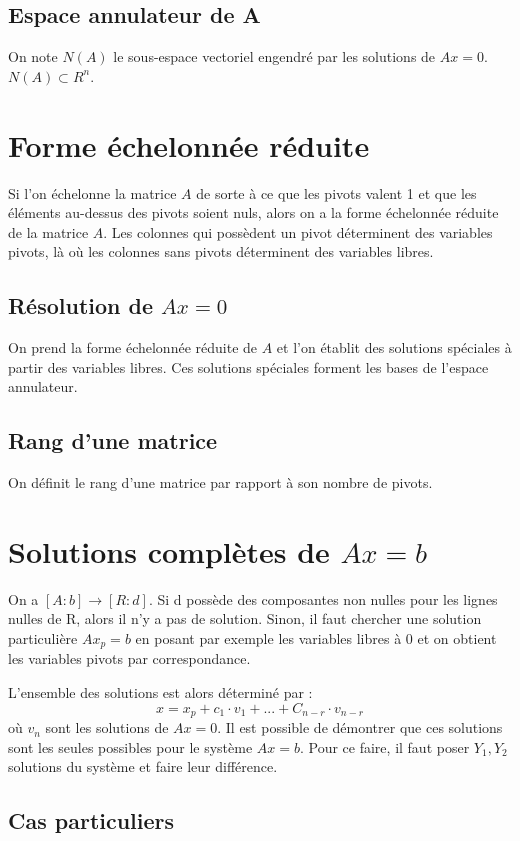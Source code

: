 \documentclass[a4paper]{book}
\begin{document}
\subsection{Espace annulateur de A}
On note $N(A)$ le sous-espace vectoriel engendré par les solutions de $Ax = 0$. $N(A) \subset R^n$.
\section{Forme échelonnée réduite}
Si l'on échelonne la matrice $A$ de sorte à ce que les pivots valent 1 et que les éléments au-dessus des pivots soient nuls, alors on a la forme échelonnée réduite de la matrice $A$. Les colonnes qui possèdent un pivot déterminent des variables pivots, là où les colonnes sans pivots déterminent des variables libres.
\subsection{Résolution de $Ax = 0$}
On prend la forme échelonnée réduite de $A$ et l'on établit des solutions spéciales à partir des variables libres. Ces solutions spéciales forment les bases de l'espace annulateur.
\subsection{Rang d'une matrice}
On définit le rang d'une matrice par rapport à son nombre de pivots.
\section{Solutions complètes de $Ax = b$}
On a $[A:b] \rightarrow [R:d]$. Si d possède des composantes non nulles pour les lignes nulles de R, alors il n'y a pas de solution.
\newline \indent Sinon, il faut chercher une solution particulière $Ax_p = b$ en posant par exemple les variables libres à 0 et on obtient les variables pivots par correspondance.
\begin{framed}
L'ensemble des solutions est alors déterminé par :
\begin{equation}
    x = x_p + c_1\cdot v_1 + ... +C_{n-r}\cdot v_{n-r}
\end{equation}
où $v_n$ sont les solutions de $Ax = 0$. Il est possible de démontrer que ces solutions sont les seules possibles pour le système $Ax = b$. Pour ce faire, il faut poser $Y_1, Y_2$ solutions du système et faire leur différence.
\end{framed}
\subsection{Cas particuliers}
\end{document}

